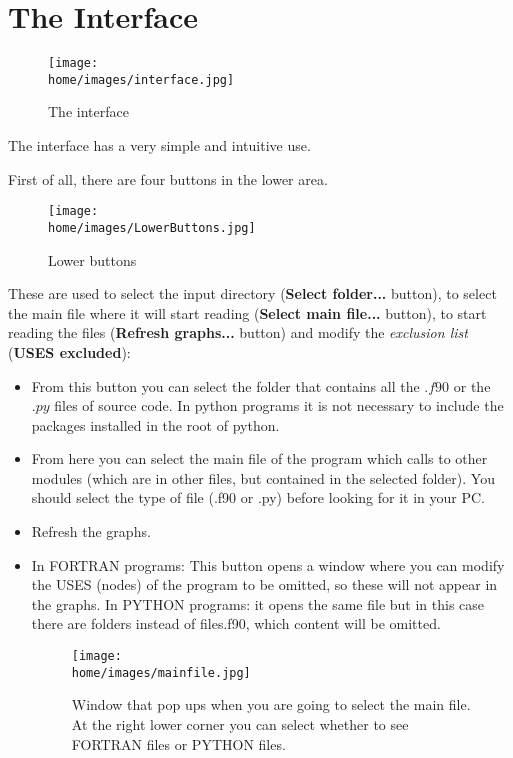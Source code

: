 \section*{The Interface}




\begin{figure}[H]
    \begin{center}
        \texttt{[image: \\home/images/interface.jpg]}
        \caption{The interface}
    \end{center}
\end{figure}



The interface has a very simple and intuitive use. 

First of all, there are four buttons in the lower area. 

\begin{figure}[H]
    \begin{center}
        \texttt{[image: \\home/images/LowerButtons.jpg]}
        \caption{Lower buttons}
    \end{center}
\end{figure}
These are used to select the input directory (\textbf{Select folder...} button), to select the main file where it will start reading (\textbf{Select main file...} button), to start reading  the files (\textbf{Refresh graphs...} button) and modify the \textit{exclusion list} (\textbf{USES excluded}):
\begin{itemize}
    \item {}   From this button you can select the folder that contains all the $.f90$ or the $.py$ files of source code. In python programs it is not necessary to include the packages installed in the root of python.
    \item {}   From here you can select the main file of the program which calls to other modules (which are in other files, but contained in the selected folder). You should select the type of file (.f90 or .py) before looking for it in your PC.
    

\item {}  Refresh the graphs.
\item {}  In FORTRAN programs: This button opens a window where you can modify the USES (nodes) of the program to be omitted, so these will not appear in the graphs. In PYTHON programs: it opens the same file but in this case there are folders instead of files.f90, which content will be omitted.
\begin{figure}[H]
    \begin{center}
        \texttt{[image: \\home/images/mainfile.jpg]}
        \caption{Window that pop ups when you are going to select the main file. At the right lower corner you can select whether to see FORTRAN files or PYTHON files.}
    \end{center}
\end{figure}
\end{itemize}

